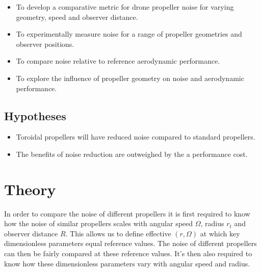 \documentclass[12pt,a4paper]{article}
\begin{document}


\begin{itemize}
    \item To develop a comparative metric for drone propeller noise for varying geometry, speed and observer distance.
    \item To experimentally measure noise for a range of propeller geometries and observer positions.
    \item To compare noise relative to reference aerodynamic performance.
    \item To explore the influence of propeller geometry on noise and aerodynamic performance.
\end{itemize}

\subsection{Hypotheses}

\begin{itemize}
    \item Toroidal propellers will have reduced noise compared to standard propellers.
    \item The benefits of noise reduction are outweighed by the a performance cost.
\end{itemize}

\section{Theory}

In order to compare the noise of different propellers it is first required to know how the noise of similar propellers scales with 
angular speed $\Omega$, radius $r_t$ and observer distance $R$.
This allows us to define effective $(r, \Omega)$ at which key dimensionless parameters equal reference values.
The noise of different propellers can then be fairly compared at these reference values.
It's then also required to know how these dimensionless parameters vary with angular speed and radius.
\end{document}
